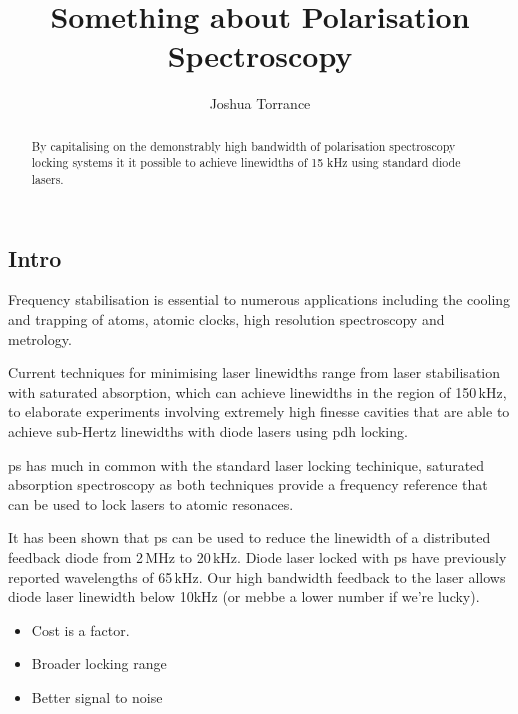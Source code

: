 \documentclass{article}
\begin{document}
\title{Something about Polarisation Spectroscopy}
\author{Joshua Torrance}

\maketitle

\begin{abstract}
By capitalising on the demonstrably high bandwidth of polarisation spectroscopy locking systems it it possible to achieve linewidths of 15 kHz using standard diode lasers.
\end{abstract}

\begin{multicols}{2}

\section{Intro}
Frequency stabilisation is essential to numerous applications including the cooling and trapping of atoms\cite{uetake_high_2008, ye_stable_2010, akamatsu_narrow_2012}, atomic clocks\cite{ludlow_sr_2008}, high resolution spectroscopy\cite{rafac_sub-dekahertz_2000} and metrology\cite{metcalf_laser_1999, ye_quantum_2008, demtroder_laser_2014}.

Current techniques for minimising laser linewidths range from laser stabilisation with saturated absorption, which can achieve linewidths in the region of 150\,kHz\cite{cuneo_optically_1994}, to elaborate experiments involving extremely high finesse cavities that are able to achieve sub-Hertz linewidths with diode lasers using \gls{pdh} locking\cite{ludlow_compact_2007}.

\Gls{ps}\cite{wieman_doppler-free_1976, demtroder_laser_2014} has much in common with the standard laser locking techinique, saturated absorption spectroscopy\cite{maguire_theoretical_2006, haroche_theory_1972, preston_doppler-free_1996} as both techniques provide a frequency reference that can be used to lock lasers to atomic resonaces.

It has been shown that \gls{ps} can be used to reduce the linewidth of a distributed feedback diode from 2\,MHz to 20\,kHz\cite{torii_laser-phase_2012}. Diode laser locked with \gls{ps} have previously reported wavelengths of 65\,kHz\cite{yoshikawa_frequency_2003}. Our high bandwidth feedback to the laser allows diode laser linewidth below 10kHz {\color{red}(or mebbe a lower number if we're lucky)}.

\begin{itemize}
\item Cost is a factor.
\item Broader locking range
\item Better signal to noise
\end{itemize}


\end{multicols}
\end{document}
